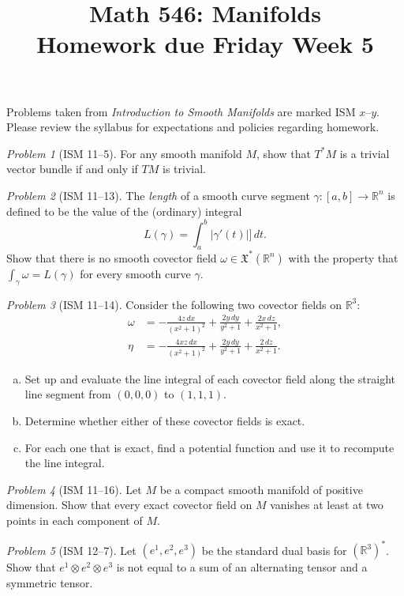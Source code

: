 \documentclass[11pt,twoside]{amsart}
\title{Math 546: Manifolds\\ Homework due Friday Week 5}
\theoremstyle{plain}
\theoremstyle{remark}
\newtheorem{prob}{Problem}
\theoremstyle{definition}
\theoremstyle{definition}
\newcommand{\RR}{\mathbb{R}}
\begin{document}
\maketitle

\noindent Problems taken from \emph{Introduction to Smooth Manifolds} are marked ISM $x$--$y$. Please review the syllabus for expectations and policies regarding homework.

\begin{prob}[ISM 11--5]
For any smooth manifold $M$, show that $T^*M$ is a trivial vector bundle if and only if $TM$ is trivial.
\end{prob}

\begin{prob}[ISM 11--13]
The \emph{length} of a smooth curve segment $\gamma\colon [a,b]\to \RR^n$ is defined to be the value of the (ordinary) integral
\[
  L(\gamma) = \int_a^b |\gamma'(t)|]\,dt.
\]
Show that there is no smooth covector field $\omega\in \mathfrak X^*(\RR^n)$ with the property that $\int_\gamma \omega = L(\gamma)$ for every smooth curve $\gamma$.
\end{prob}

\begin{prob}[ISM 11--14]
Consider the following two covector fields on $\RR^3$:
\[
\begin{aligned}
  \omega &= -\frac{4z\,dx}{(x^2+1)^2}+\frac{2y\,dy}{y^2+1}+\frac{2x\,dz}{x^2+1},\\
  \eta &= -\frac{4xz\,dx}{(x^2+1)^2}+\frac{2y\,dy}{y^2+1}+\frac{2\,dz}{x^2+1}.
\end{aligned}
\]
\begin{enumerate}[(a)]
\item Set up and evaluate the line integral of each covector field along the straight line segment from $(0,0,0)$ to $(1,1,1)$.
\item Determine whether either of these covector fields is exact.
\item For each one that is exact, find a potential function and use it to recompute the line integral.
\end{enumerate}
\end{prob}

\begin{prob}[ISM 11--16]
Let $M$ be a compact smooth manifold of positive dimension. Show that every exact covector field on $M$ vanishes at least at two points in each component of $M$.
\end{prob}

\begin{prob}[ISM 12--7]
Let $(e^1,e^2,e^3)$ be the standard dual basis for $(\RR^3)^*$. Show that $e^1\otimes e^2\otimes e^3$ is not equal to a sum of an alternating tensor and a symmetric tensor.
\end{prob}
\end{document}
